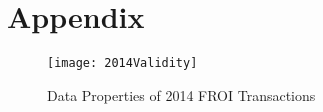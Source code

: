 \documentclass[9pt, oneside]{article}   	%
\begin{document}
\pagebreak

\section{Appendix}








\pagebreak




\begin{figure}[htp]
\caption{Data Properties of 2014 FROI Transactions}

\label{2014 Quality}
\begin{center}
\texttt{[image: 2014Validity]}
\end{center}
\end{figure}
\end{document}
